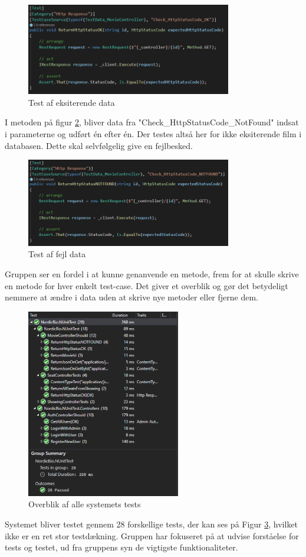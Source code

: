 \begin{figure}[H]
    \centering
    \includegraphics[width=0.8\textwidth]{figures/testmoviestatusok.PNG}
    \caption{Test af eksiterende data}
    \label{fig:testeks}
\end{figure}

I metoden på figur \ref{fig:testeks2}, bliver data fra "Check\_HttpStatusCode\_NotFound" indsat i parameterne
og udført én efter én. Der testes altså her for ikke eksiterende film i databasen. Dette skal selvfølgelig
give en fejlbesked.  

\begin{figure}[H]
    \centering
    \includegraphics[width=0.8\textwidth]{figures/testmoviestatusnotfound.PNG}
    \caption{Test af fejl data}
    \label{fig:testeks2}
\end{figure}

Gruppen ser en fordel i at kunne genanvende en metode, 
frem for at skulle skrive en metode for hver enkelt test-case. 
Det giver et overblik og gør det betydeligt nemmere at ændre i data uden at skrive nye metoder eller fjerne dem.\\

\begin{figure}[H]
    \centering
    \includegraphics[width=0.6\textwidth]{figures/AllTests.png}
    \caption{Overblik af alle systemets tests}
    \label{fig:alltests}
\end{figure}


Systemet bliver testet gennem 28 forskellige tests, der kan ses på Figur \ref{fig:alltests}, hvilket ikke er en ret stor testdækning. 
Gruppen har fokuseret på at udvise forståelse for tests og testet, ud fra gruppens syn de vigtigste funktionaliteter.    